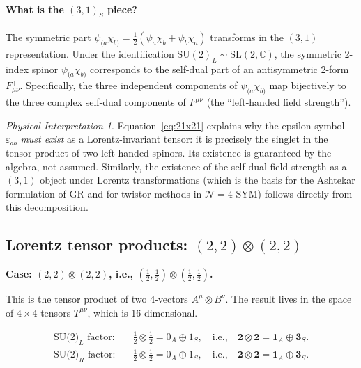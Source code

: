 \documentclass[12pt]{article}
\theoremstyle{remark}
\newtheorem*{physinterp}{Physical Interpretation}
\begin{document}
\paragraph{What is the $(3,1)_S$ piece?}
The symmetric part $\psi_{(a}\chi_{b)} = \tfrac{1}{2}(\psi_a\chi_b + \psi_b\chi_a)$
transforms in the $(3,1)$ representation.  Under the identification
$\mathrm{SU}(2)_L \sim \mathrm{SL}(2,\mathbb{C})$, the symmetric 2-index spinor
$\psi_{(a}\chi_{b)}$ corresponds to the self-dual part of an antisymmetric
2-form $F^+_{\mu\nu}$.  Specifically, the three independent components of
$\psi_{(a}\chi_{b)}$ map bijectively to the three complex self-dual components
of $F^{\mu\nu}$ (the ``left-handed field strength'').

\begin{physinterp}
  Equation~\eqref{eq:21x21} explains why the epsilon symbol $\varepsilon_{ab}$
  \emph{must exist} as a Lorentz-invariant tensor: it is precisely the singlet
  in the tensor product of two left-handed spinors.  Its existence is
  guaranteed by the algebra, not assumed.  Similarly, the existence of the
  self-dual field strength as a $(3,1)$ object under Lorentz transformations
  (which is the basis for the Ashtekar formulation of GR and for twistor methods
  in $\mathcal{N}=4$ SYM) follows directly from this decomposition.
\end{physinterp}

\subsection{Lorentz tensor products: \texorpdfstring{$(2,2)\otimes(2,2)$}{(2,2)x(2,2)}}

\noindent\textbf{Case: $(2,2)\otimes(2,2)$, i.e., $(\tfrac{1}{2},\tfrac{1}{2})\otimes(\tfrac{1}{2},\tfrac{1}{2})$.}

This is the tensor product of two 4-vectors $A^\mu \otimes B^\nu$.
The result lives in the space of $4\times 4$ tensors $T^{\mu\nu}$, which is 16-dimensional.

\begin{align*}
  \text{SU(2)}_L\text{ factor:} &\quad
  \tfrac{1}{2}\otimes\tfrac{1}{2} = 0_A \oplus 1_S,
  \quad\text{i.e.,}\quad \mathbf{2}\otimes\mathbf{2} = \mathbf{1}_A \oplus \mathbf{3}_S.\\[3pt]
  \text{SU(2)}_R\text{ factor:} &\quad
  \tfrac{1}{2}\otimes\tfrac{1}{2} = 0_A \oplus 1_S,
  \quad\text{i.e.,}\quad \mathbf{2}\otimes\mathbf{2} = \mathbf{1}_A \oplus \mathbf{3}_S.
\end{align*}
\end{document}
